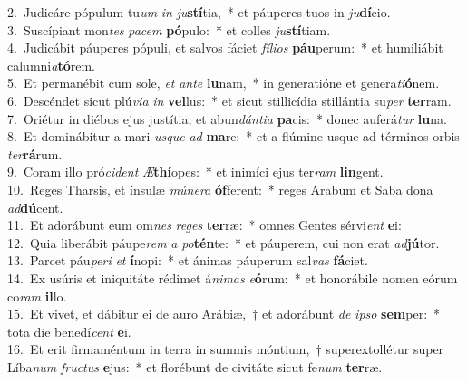 {2.~}Judicáre pópulum tu\textit{um} \textit{in} \textit{ju}\textbf{stí}tia,~* et páuperes tuos in \textit{ju}\textbf{dí}cio.\\
{3.~}Suscípiant mon\textit{tes} \textit{pa}\textit{cem} \textbf{pó}pulo:~* et colles \textit{ju}\textbf{stí}tiam.\\
{4.~}Judicábit páuperes pópuli, et salvos fáciet \textit{fí}\textit{li}\textit{os} \textbf{páu}perum:~* et humiliábit calumni\textit{a}\textbf{tó}rem.\\
{5.~}Et permanébit cum sole, \textit{et} \textit{an}\textit{te} \textbf{lu}nam,~* in generatióne et genera\textit{ti}\textbf{ó}nem.\\
{6.~}Descéndet sicut plú\textit{vi}\textit{a} \textit{in} \textbf{vel}lus:~* et sicut stillicídia stillántia su\textit{per} \textbf{ter}ram.\\
{7.~}Oriétur in diébus ejus justítia, et abun\textit{dán}\textit{ti}\textit{a} \textbf{pa}cis:~* donec auferá\textit{tur} \textbf{lu}na.\\
{8.~}Et dominábitur a mari \textit{us}\textit{que} \textit{ad} \textbf{ma}re:~* et a flúmine usque ad términos orbis \textit{ter}\textbf{rá}rum.\\
{9.~}Coram illo pró\textit{ci}\textit{dent} \textit{Æ}\textbf{thí}opes:~* et inimíci ejus ter\textit{ram} \textbf{lin}gent.\\
{10.~}Reges Tharsis, et ínsulæ \textit{mú}\textit{ne}\textit{ra} \textbf{óf}ferent:~* reges Arabum et Saba dona \textit{ad}\textbf{dú}cent.\\
{11.~}Et adorábunt eum om\textit{nes} \textit{re}\textit{ges} \textbf{ter}ræ:~* omnes Gentes sérvi\textit{ent} \textbf{e}i:\\
{12.~}Quia liberábit páupe\textit{rem} \textit{a} \textit{po}\textbf{tén}te:~* et páuperem, cui non erat \textit{ad}\textbf{jú}tor.\\
{13.~}Parcet páu\textit{pe}\textit{ri} \textit{et} \textbf{í}nopi:~* et ánimas páuperum sal\textit{vas} \textbf{fá}ciet.\\
{14.~}Ex usúris et iniquitáte rédimet á\textit{ni}\textit{mas} \textit{e}\textbf{ó}rum:~* et honorábile nomen eórum co\textit{ram} \textbf{il}lo.\\
{15.~}Et vivet, et dábitur ei de auro Arábiæ,~† et adorábunt \textit{de} \textit{i}\textit{pso} \textbf{sem}per:~* tota die benedí\textit{cent} \textbf{e}i.\\
{16.~}Et erit firmaméntum in terra in summis móntium,~† superextollétur super Líba\textit{num} \textit{fru}\textit{ctus} \textbf{e}jus:~* et florébunt de civitáte sicut fe\textit{num} \textbf{ter}ræ.\\
